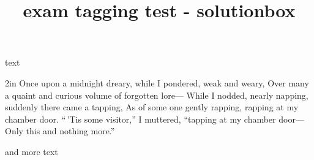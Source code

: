 \documentclass{exam}
\title{exam tagging test - solutionbox}
\begin{document}
text
\begin{solutionbox}{2in}
  Once upon a midnight dreary, while I pondered, weak and weary, Over
  many a quaint and curious volume of forgotten lore--- While I
  nodded, nearly napping, suddenly there came a tapping, As of some
  one gently rapping, rapping at my chamber door.  ``\,'Tis some
  visitor,'' I muttered, ``tapping at my chamber door--- Only this and
  nothing more.''
\end{solutionbox}
and more text
\end{document}
